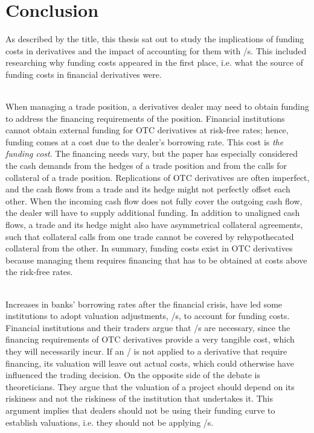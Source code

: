 \documentclass[main.tex]{subfiles}
\begin{document}
    \part{Conclusion}

    As described by the title, this thesis sat out to study the implications
    of funding costs in derivatives and the impact of accounting for them with \FVA/s.
    This included researching why funding costs appeared in the first place,
    i.e. what the source of funding costs in financial derivatives were.
    
    \textbf{\researchQuestionFundingCosts}\\
    When managing a trade position, a derivatives dealer may need to obtain funding 
    to address the financing requirements of the position.
    Financial institutions cannot obtain external funding for OTC derivatives at risk-free rates;
    hence, funding comes at a cost due to the dealer's borrowing rate.
    This cost is \textit{the funding cost}.
    The financing needs vary, but the paper has especially considered
    the cash demands from the hedges of a trade position
    and from the calls for collateral of a trade position.
    Replications of OTC derivatives are often imperfect,
    and the cash flows from a trade and its hedge might not perfectly offset each other.
    When the incoming cash flow does not fully cover the outgoing cash flow,
    the dealer will have to supply additional funding.
    In addition to unaligned cash flows, 
    a trade and its hedge might also have asymmetrical collateral agreements,
    such that collateral calls from one trade cannot be covered by rehypothecated collateral from the other.
    In summary, funding costs exist in OTC derivatives
    because managing them requires financing 
    that has to be obtained at costs above the risk-free rates.

    \textbf{\researchQuestionFvaDebate}\\
    Increases in banks' borrowing rates after the financial crisis,
    have led some institutions to adopt valuation adjustments, \FVA/s, to account for funding costs.
    Financial institutions and their traders argue that \FVA/s are necessary,
    since the financing requirements of OTC derivatives provide a very tangible cost,
    which they will necessarily incur.
    If an \FVA/ is not applied to a derivative that require financing,
    its valuation will leave out actual costs, 
    which could otherwise have influenced the trading decision.
    On the opposite side of the debate is theoreticians.
    They argue that the valuation of a project should depend on its riskiness
    and not the riskiness of the institution that undertakes it.
    This argument implies that dealers should not be using their funding curve to establish 
    valuations, i.e. they should not be applying \FVA/s.
\end{document}
